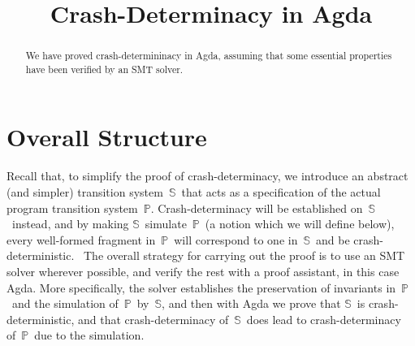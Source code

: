\documentclass[letterpaper,twocolumn,10pt]{article}
\theoremstyle{definition}
\newcommand{\Spec}{\ensuremath{\mathbb S}}
\newcommand{\Prog}{\ensuremath{\mathbb P}}
\begin{document}
\title{Crash-Determinacy in Agda}
\maketitle

\begin{abstract}
We have proved crash-determininacy in Agda, assuming that some essential properties have been verified by an SMT solver.
\end{abstract}


\section{Overall Structure}

Recall that, to simplify the proof of crash-determinacy, we introduce an abstract (and simpler) transition system~\Spec\ that acts as a specification of the actual program transition system~\Prog.
Crash-determinacy will be established on~\Spec\ instead, and by making \Spec\ simulate~\Prog\ (a notion which we will define below), every well-formed fragment in~\Prog\ will correspond to one in~\Spec\ and be crash-deterministic.%
\
The overall strategy for carrying out the proof is to use an SMT solver wherever possible, and verify the rest with a proof assistant, in this case Agda.
More specifically, the solver establishes the preservation of invariants in~\Prog\ and the simulation of~\Prog\ by~\Spec, and then with Agda we prove that \Spec\ is crash-deterministic, and that crash-determinacy of~\Spec\ does lead to crash-determinacy of~\Prog\ due to the simulation.
\end{document}
